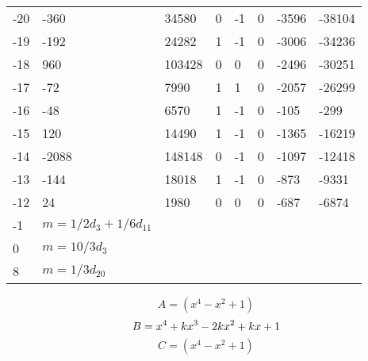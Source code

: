\documentclass{amsart}
\begin{document}
\begin{longtable}{|l|l|l|lllll|}
-20&-360&34580&0&-1&0&-3596&-38104\\
-19&-192&24282&1&-1&0&-3006&-34236\\
-18&960&103428&0&0&0&-2496&-30251\\
-17&-72&7990&1&1&0&-2057&-26299\\
-16&-48&6570&1&-1&0&-105&-299\\
-15&120&14490&1&-1&0&-1365&-16219\\
-14&-2088&148148&0&-1&0&-1097&-12418\\
-13&-144&18018&1&-1&0&-873&-9331\\
-12&24&1980&0&0&0&-687&-6874\\
-1&$m=1/2d_{3}+1/6d_{11}$&&\multicolumn{5}{c|}{}\\
0&$m=10/3d_{3}$&&\multicolumn{5}{c|}{}\\
8&$m=1/3d_{20}$&&\multicolumn{5}{c|}{}\\
\hline
\end{longtable}
$$A=(x^4
 - x^2
 + 1)$$
$$B=x^4
 + k\*x^3
 - 2\*k\*x^2
 + k\*x
 + 1$$
$$C=(x^4
 - x^2
 + 1)$$
\end{document}

